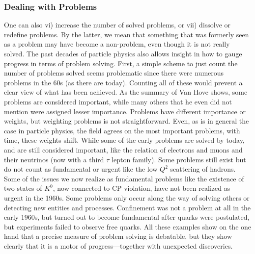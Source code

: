 \subsubsection{Dealing with Problems}

One can also vi) increase the number of solved problems, or vii) dissolve or redefine problems. 
By the latter, we mean that something that was formerly seen as a problem may have become a non-problem, even though it is not really solved. 
The past decades of particle physics also allows insight in how to gauge progress in terms of problem solving.
First, a simple scheme to just count the number of problems solved seems problematic since there were numerous problems in the 60s (as there are today).
Counting all of these would prevent a clear view of what has been achieved. 
As the summary of Van Hove shows, some problems are considered important, while many others that he even did not mention were assigned lesser importance.
Problems have different importance or weights, but weighting problems is not straightforward. 
Even, as is in general the case in particle physics, the field agrees on the most important problems, with time, these weights shift.
While some of the early problems are solved by today, and are still considered important, like the relation of electrons and muons and their neutrinos (now with a third $\tau $ lepton family). 
Some problems still exist but do not count as fundamental or urgent like the low $Q^2$ scattering of hadrons.
Some of the issues we now realize as fundamental problems like the existence of two states of $K^0$, now connected to CP violation, have not been realized as urgent in the 1960s.
Some problems only occur along the way of solving others or detecting new entities and processes. 
Confinement was not a problem at all in the early 1960s, but turned out to become fundamental after quarks were postulated, but experiments failed to observe free quarks.
All these examples show on the one hand that a precise measure of problem solving is debatable,  but they show clearly that it is a motor of progress---together with unexpected discoveries.

